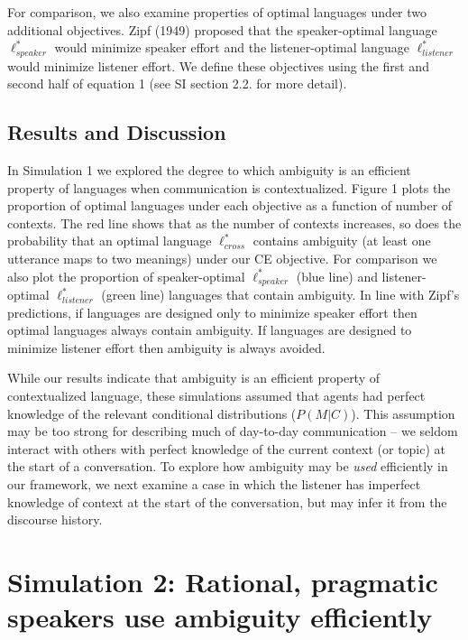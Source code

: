 \documentclass[10pt, letterpaper]{article}
\begin{document}
For comparison, we also examine properties of optimal languages under
two additional objectives. Zipf (1949) proposed that the speaker-optimal
language \(\ell_{speaker}^*\) would minimize speaker effort and the
listener-optimal language \(\ell_{listener}^*\) would minimize listener
effort. We define these objectives using the first and second half of
equation 1 (see SI section 2.2. for more detail).\par

\subsection{Results and Discussion}\label{results-and-discussion}

In Simulation 1 we explored the degree to which ambiguity is an
efficient property of languages when communication is contextualized.
Figure 1 plots the proportion of optimal languages under each objective
as a function of number of contexts. The red line shows that as the
number of contexts increases, so does the probability that an optimal
language \(\ell^*_{cross}\) contains ambiguity (at least one utterance
maps to two meanings) under our CE objective. For comparison we also
plot the proportion of speaker-optimal \(\ell^*_{speaker}\) (blue line)
and listener-optimal \(\ell^*_{listener}\) (green line) languages that
contain ambiguity. In line with Zipf's predictions, if languages are
designed only to minimize speaker effort then optimal languages always
contain ambiguity. If languages are designed to minimize listener effort
then ambiguity is always avoided.\par

While our results indicate that ambiguity is an efficient property of
contextualized language, these simulations assumed that agents had
perfect knowledge of the relevant conditional distributions
(\(P(M|C)\)). This assumption may be too strong for describing much of
day-to-day communication -- we seldom interact with others with perfect
knowledge of the current context (or topic) at the start of a
conversation. To explore how ambiguity may be \textit{used} efficiently
in our framework, we next examine a case in which the listener has
imperfect knowledge of context at the start of the conversation, but may
infer it from the discourse history.\par

\section{Simulation 2: Rational, pragmatic speakers use ambiguity
efficiently}\label{simulation-2-rational-pragmatic-speakers-use-ambiguity-efficiently}
\end{document}
